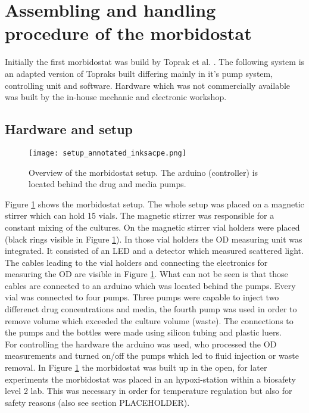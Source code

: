 


\section{Assembling and handling procedure of the morbidostat}
Initially the first morbidostat was build by Toprak et al. \cite{morb_toprak}. The following system is an adapted version of Topraks built differing mainly in it's pump system, controlling unit and software. Hardware which was not commercially available was built by the in-house mechanic and electronic workshop.

\subsection{Hardware and setup}

\begin{figure}[H]
	\texttt{[image: setup\_annotated\_inksacpe.png]}
	\caption{Overview of the morbidostat setup. The arduino (controller) is located behind the drug and media pumps.}
	\label{figure:morbidostat_setup}
\end{figure}  
Figure \ref{figure:morbidostat_setup} shows the morbidostat setup.
The whole setup was placed on a magnetic stirrer which can hold 15 vials. The magnetic stirrer was responsible for a constant mixing of the cultures. On the magnetic stirrer vial holders were placed (black rings visible in Figure \ref{figure:morbidostat_setup}). In those vial holders the OD measuring unit was integrated. It consisted of an LED and a detector which measured scattered light. The cables leading to the vial holders and  connecting the electronics for measuring the OD are visible in Figure \ref{figure:morbidostat_setup}. What can not be seen is that those cables are connected to an arduino which was located behind the pumps. Every vial was connected to four pumps. Three pumps were capable to inject two differenct drug concentrations and media, the fourth pump was used in order to remove volume which exceeded the culture volume (waste). The connections to the pumps and the bottles were made using silicon tubing and plastic luers. \\
For controlling the hardware  the arduino was used, who processed the OD measurements and turned on/off the pumps which led to fluid injection or waste removal.
In Figure \ref{figure:morbidostat_setup} the morbidostat was built up in the open, for later experiments the morbidostat was placed in an hypoxi-station within a biosafety level 2 lab. This was necessary in order for temperature regulation but also for safety reasons (also see section PLACEHOLDER).  

